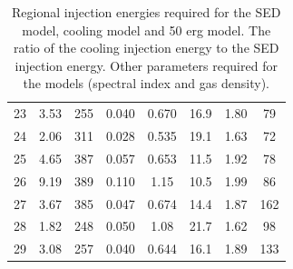 \documentclass[12pt,a4paper]{article}
\begin{document}
\begin{table}[H]
\begin{center}
\begin{tabular}{cccccccc}
			23 & 3.53 & 255 & 0.040 & 0.670 & 16.9 & 1.80 & 79 \\ 
			24 & 2.06 & 311 & 0.028 & 0.535 & 19.1 & 1.63 & 72 \\ 
			25 & 4.65 & 387 & 0.057 & 0.653 & 11.5 & 1.92 & 78 \\ 
			26 & 9.19 & 389 & 0.110 & 1.15 & 10.5 & 1.99 & 86 \\ 
			27 & 3.67 & 385 & 0.047 & 0.674 & 14.4 & 1.87 & 162 \\ 
			28 & 1.82 & 248 & 0.050 & 1.08 & 21.7 & 1.62 & 98 \\ 
			29 & 3.08 & 257 & 0.040 & 0.644 & 16.1 & 1.89 & 133 \\ 
			\bottomrule
		\end{tabular} 
	\end{center}
	\caption{Regional injection energies required for the SED model, cooling model and 50 erg model. The ratio of the cooling injection energy to the SED injection energy. Other parameters required for the models (spectral index and gas density).}
	\label{tab:hadronicparams}
\end{table}
\end{document}
